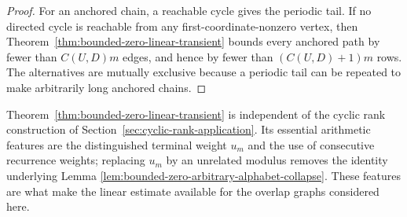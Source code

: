 \begin{proof}
For an anchored chain, a reachable cycle gives the periodic tail.  If no
directed cycle is reachable from any first-coordinate-nonzero vertex, then
Theorem~\ref{thm:bounded-zero-linear-transient} bounds every anchored path by
fewer than $C(U,D)m$ edges, and hence by fewer than $(C(U,D)+1)m$ rows.  The
alternatives are mutually exclusive because a periodic tail can be repeated
to make arbitrarily long anchored chains.
\end{proof}

\begin{remark}
\label{rem:bounded-zero-standard-object-boundary}
Theorem~\ref{thm:bounded-zero-linear-transient} is independent of the cyclic
rank construction of Section~\ref{sec:cyclic-rank-application}.  Its
essential arithmetic features are the distinguished terminal weight $u_m$
and the use of consecutive recurrence weights; replacing $u_m$ by an
unrelated modulus removes the identity underlying Lemma
\ref{lem:bounded-zero-arbitrary-alphabet-collapse}.  These features are what
make the linear estimate available for the overlap graphs considered here.
\end{remark}
